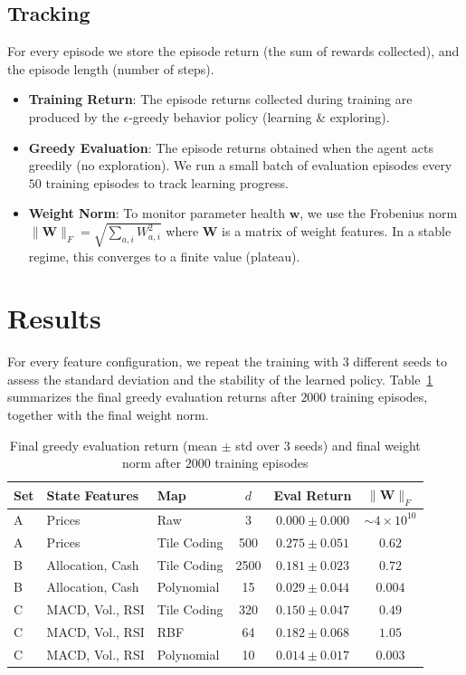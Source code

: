 \documentclass[pdflatex,sn-mathphys-num]{sn-jnl}
\begin{document}
\subsection{Tracking}
For every episode we store the episode return (the sum of rewards collected), and the episode length (number of steps).
\begin{itemize}
\item \textbf{Training Return}: The episode returns collected during training are produced by the $\epsilon$-greedy behavior policy (learning \& exploring).
\item \textbf{Greedy Evaluation}: The episode returns obtained when the agent acts greedily (no exploration). We run a small batch of evaluation episodes every $50$ training episodes to track learning progress.
\item \textbf{Weight Norm}: To monitor parameter health $\mathbf{w}$, we use the Frobenius norm $\|\boldsymbol{W}\|_F = \sqrt{\sum_{a,i} W_{a,i}^2}$ where $\boldsymbol{W}$ is a matrix of weight features. In a stable regime, this converges to a finite value (plateau).
\end{itemize}
\section{Results}
\label{sec:results}

For every feature configuration, we repeat the training with 3 different seeds to assess the standard deviation 
and the stability of the learned policy. 
Table~\ref{tab:final_results} summarizes the final greedy evaluation returns after $2000$ training episodes, together with the final weight norm.

\begin{table}[htbp]
\centering
\caption{Final greedy evaluation return (mean $\pm$ std over 3 seeds) and final weight norm after $2000$ training episodes}
\label{tab:final_results}
\begin{tabular}{lllccc}
\toprule
\textbf{Set} & \textbf{State Features} & \textbf{Map} & $d$ & \textbf{Eval Return} & $\|\mathbf{W}\|_F$ \\
\midrule
A & Prices & Raw & 3 & $0.000 \pm 0.000$ & ${\sim}4 \times 10^{10}$ \\
A & Prices & Tile Coding & 500 & $\mathbf{0.275 \pm 0.051}$ & $0.62$ \\
B & Allocation, Cash & Tile Coding & 2500 & $0.181 \pm 0.023$ & $0.72$ \\
B & Allocation, Cash & Polynomial & 15 & $0.029 \pm 0.044$ & $0.004$ \\
C & MACD, Vol., RSI & Tile Coding & 320 & $0.150 \pm 0.047$ & $0.49$ \\
C & MACD, Vol., RSI & RBF & 64 & $0.182 \pm 0.068$ & $1.05$ \\
C & MACD, Vol., RSI & Polynomial & 10 & $0.014 \pm 0.017$ & $0.003$ \\
\bottomrule
\end{tabular}
\end{table}
\end{document}
